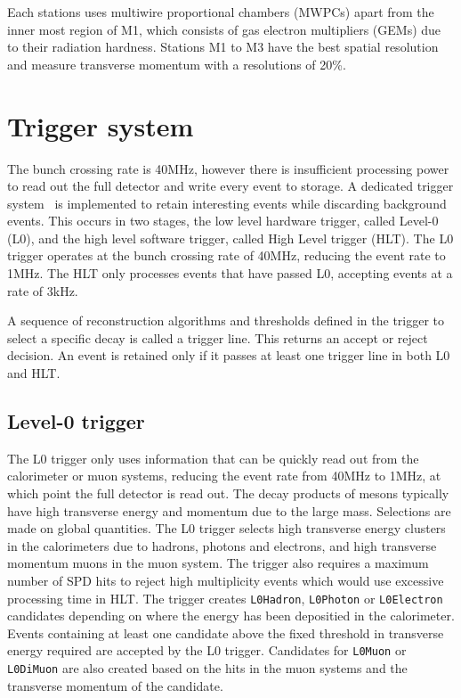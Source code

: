 Each stations uses multiwire proportional chambers (MWPCs) apart from the inner most region of M1, which consists of gas electron multipliers (GEMs) due to their radiation hardness. Stations M1 to M3 have the best spatial resolution and measure transverse momentum with a resolutions of 20\%.

\section{Trigger system}

The \lhc bunch crossing rate is 40MHz, however there is insufficient processing power to read out the full detector and write every event to storage. A dedicated trigger system~\cite{LHCb-DP-2012-004} is implemented to retain interesting events while discarding background events. This occurs in two stages, the low level hardware trigger, called Level-0 (L0), and the high level software trigger, called High Level trigger (HLT). The L0 trigger operates at the bunch crossing rate of 40MHz, reducing the event rate to 1MHz. The HLT only processes events that have passed L0, accepting events at a rate of 3kHz.

A sequence of reconstruction algorithms and thresholds defined in the trigger to select a specific decay is called a trigger line. This returns an accept or reject decision. An event is retained only if it passes at least one trigger line in both L0 and HLT.

\subsection{Level-0 trigger}

The L0 trigger only uses information that can be quickly read out from the calorimeter or muon systems, reducing the event rate from 40MHz to 1MHz, at which point the full detector is read out. The decay products of \B mesons typically have high transverse energy and momentum due to the large \B mass. Selections are made on global quantities. The L0 trigger selects high transverse energy clusters in the calorimeters due to hadrons, photons and electrons, and high transverse momentum muons in the muon system. The trigger also requires a maximum number of SPD hits to reject high multiplicity events which would use excessive processing time in HLT. The trigger creates {\tt L0Hadron}, {\tt L0Photon} or {\tt L0Electron} candidates depending on where the energy has been depositied in the calorimeter. Events containing at least one candidate above the fixed threshold in transverse energy required are accepted by the L0 trigger. Candidates for {\tt L0Muon} or {\tt L0DiMuon} are also created based on the hits in the muon systems and the transverse momentum of the candidate.

